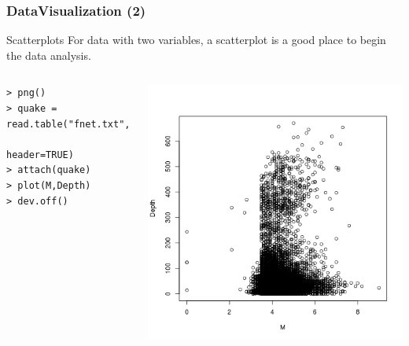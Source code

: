 \documentclass[10pt]{beamer}
\begin{document}
\begin{frame}
  \frametitle{DataVisualization (2)}
  \begin{block}{Scatterplots}
    For data with two variables, a scatterplot is a good place to
    begin the data analysis.
  \end{block}
  \begin{columns}[c]
   \small{
\begin{verbatim}
> png()
> quake = read.table("fnet.txt",
                     header=TRUE)
> attach(quake)
> plot(M,Depth)
> dev.off()
\end{verbatim}}
\includegraphics[width=1\textwidth]{img/scatter.png}
\end{columns}

\end{frame}
\end{document}
